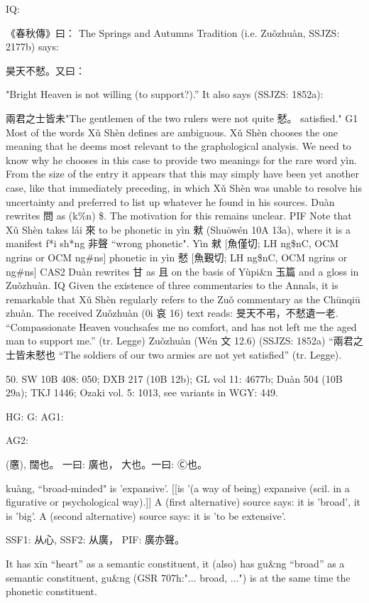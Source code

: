 IQ:

《春秋傳》曰： The Springs and Autumns Tradition (i.e. Zuǒzhuàn, SSJZS: 2177b) says:

昊天不憖。又曰：

"Bright Heaven is not willing (to support?).'' It also says (SSJZS: 1852a):

兩君之士皆未"The   gentlemen   of   the   two   rulers   were   not   quite
憖。	satisfied."
G1 Most of the words Xǔ Shèn defines are ambiguous. Xǔ Shèn chooses the one meaning that he deems most relevant to the graphological analysis. We need to know why he chooses in this case to provide two meanings for the rare word yìn. From the size of the entry it appears that this may simply have been yet another case, like that immediately preceding, in which Xǔ Shèn was unable to resolve his uncertainty and preferred to list up whatever he found in his sources.
Duàn rewrites 問 as (k\%n) \$. The motivation for this remains unclear.
PIF     Note that Xǔ Shèn takes lái 來 to be phonetic in yìn 猌 (Shuōwén 10A 13a), where it is a manifest f*i sh*ng 非聲 ``wrong phonetic".
    Yìn 猌 [魚僅切; LH ng\$nC, OCM ngrins or OCM ng\#ns] phonetic in yìn 憖 [魚覲切; LH ng\$nC, OCM ngrins or ng\#ns]
CAS2 Duàn rewrites 甘 as 且 on the basis of Yùpi&n 玉篇 and a gloss in Zuǒzhuàn.
IQ Given the existence of three commentaries to the Annals, it is remarkable that Xǔ Shèn regularly refers to the Zuǒ commentary as the Chūnqiū zhuàn.
The received Zuǒzhuàn (0i 哀 16) text reads: 旻天不弔，不憖遺一老. ``Compassionate
Heaven vouchsafes me no comfort, and has not left me the aged man to support me.'' (tr. Legge)
    Zuǒzhuàn (Wén 文 12.6) (SSJZS: 1852a) ``兩君之士皆未憖也 ``The soldiers of our two armies are not yet satisfied'' (tr. Legge).



50. SW 10B 408: 050; DXB 217 (10B 12b); GL vol 11: 4677b; Duàn 504 (10B 29a); TKJ 1446; Ozaki vol. 5: 1013, see
variants in WGY: 449.


HG:
G: AG1:

AG2:

(懬),
闊也。
一曰: 廣也， 大也。一曰:
Ⓒ也。

kuàng, ``broad-minded"
is 'expansive'. [[is '(a way of being) expansive (scil. in a figurative or psychological way).]]
A (first alternative) source says: it is 'broad',
it is 'big'.
A (second alternative) source says: it is 'to be extensive'.

SSF1: 从心,
SSF2: 从廣，
PIF:	廣亦聲。

It has xīn ``heart'' as a semantic constituent,
it (also) has gu&ng ``broad'' as a semantic constituent,
gu&ng (GSR 707h:"... broad, ...") is at the same time the phonetic constituent.

